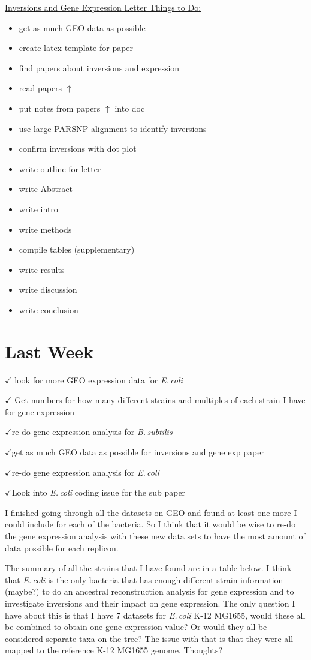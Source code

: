 \documentclass[12pt]{article}
\newcommand{\bass}{\textit{B.\,subtilis}\xspace}
\newcommand{\ecol}{\textit{E.\,coli}\xspace}
\newcommand{\ch}{$\checkmark$}
\begin{document}
\underline{Inversions and Gene Expression Letter Things to Do:}
\begin{itemize}
	\item \sout{get as much GEO data as possible}
	\item create latex template for paper
	\item find papers about inversions and expression
	\item read papers $\uparrow$
	\item put notes from papers $\uparrow$ into doc
	\item use large PARSNP alignment to identify inversions
	\item confirm inversions with dot plot
	\item write outline for letter
	\item write Abstract
	\item write intro
	\item write methods
	\item compile tables (supplementary)
	\item write results
	\item write discussion
	\item write conclusion 
\end{itemize}




	
\section*{Last Week}

$\checkmark$ look for more GEO expression data for \ecol

$\checkmark$ Get numbers for how many different strains and multiples of each strain I have for gene expression

\ch re-do gene expression analysis for \bass

\ch get as much GEO data as possible for inversions and gene exp paper

\ch re-do gene expression analysis for \ecol

\ch Look into \ecol coding issue for the sub paper

I finished going through all the datasets on GEO and found at least one more I could include for each of the bacteria. So I think that it would be wise to re-do the gene expression analysis with these new data sets to have the most amount of data possible for each replicon.

The summary of all the strains that I have found are in a table below.
I think that \ecol is the only bacteria that has enough different strain information (maybe?) to do an ancestral reconstruction analysis for gene expression and to investigate inversions and their impact on gene expression.
The only question I have about this is that I have 7 datasets for \ecol K-12 MG1655, would these all be combined to obtain one gene expression value? Or would they all be considered separate taxa on the tree? The issue with that is that they were all mapped to the reference K-12 MG1655 genome. Thoughts?
\end{document}
